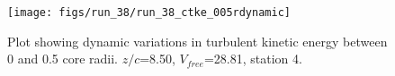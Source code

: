 \begin{figure}[H]
\centering
\texttt{[image: figs/run\_38/run\_38\_ctke\_005rdynamic]}
\caption{Plot showing dynamic variations in turbulent kinetic energy between 0 and 0.5 core radii. $z/c$=8.50, $V_{free}$=28.81, station 4.}
\label{fig:run_38_ctke_005rdynamic}
\end{figure}


